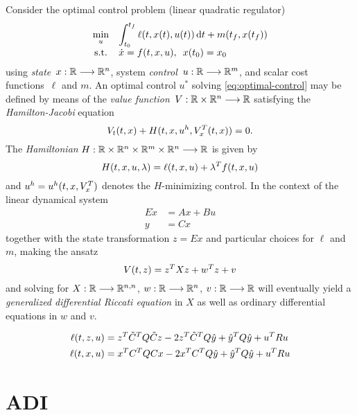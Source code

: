 Consider the optimal control problem
(linear quadratic regulator)
\begin{equation}
  \everymath{\displaystyle}
  \begin{array}{cl}
    \min_u & \int_{t_0}^{t_f} \ell(t, x(t), u(t)) \dt + m(t_f, x(t_f)) \\
    \text{s.t.} & \dot{x} = f(t,x,u), \enspace x(t_0) = x_0
  \end{array}
  \label{eq:optimal-control}
\end{equation}
using \emph{state}~$x:\mathbb{R}\longrightarrow\mathbb{R}^n$, system \emph{control}~$u:\mathbb{R}\longrightarrow\mathbb{R}^m$,
and scalar cost functions~$\ell$ and $m$.
An optimal control $u^*$ solving \eqref{eq:optimal-control} may be defined by means of the
\emph{value function}~$V:\mathbb{R}\times\mathbb{R}^n\longrightarrow\mathbb{R}$ satisfying the \emph{Hamilton-Jacobi} equation
\begin{equation}
  V_t(t,x) + H(t,x,u^h,V_x^T(t,x)) = 0.
  \label{eq:hamilton-jacobi}
\end{equation}
The \emph{Hamiltonian} $H:\mathbb{R}\times\mathbb{R}^n\times\mathbb{R}^m\times\mathbb{R}^n\longrightarrow\mathbb{R}$ is given by
\begin{equation}
  H(t,x,u,\lambda) = \ell(t,x,u) + \lambda^T f(t,x,u)
\end{equation}
and $u^h = u^h(t,x,V_x^T)$ denotes the $H$-minimizing control.
In the context of the linear dynamical system
\begin{equation}
  \begin{aligned}
    E\dot{x} &= Ax + Bu \\
    y &= Cx
  \end{aligned}
\end{equation}
together with the state transformation $z=Ex$ and particular choices for $\ell$ and $m$,
making the ansatz
\begin{equation}
  V(t,z) = z^T Xz + w^T z + v
\end{equation}
and solving for $X:\mathbb{R}\longrightarrow\mathbb{R}^{n,n}$, $w:\mathbb{R}\longrightarrow\mathbb{R}^n$, $v:\mathbb{R}\longrightarrow\mathbb{R}$ will eventually
yield a \emph{generalized differential Riccati equation} in $X$ as well as
ordinary differential equations in $w$ and $v$.
\cite{Locatelli2011}

\begin{align}
  \ell(t, z, u) &= z^T \tilde C^T Q \tilde C z - 2z^T \tilde C^T Q \hat y + \hat y^T Q \hat y + u^T R u \\
  \ell(t, x, u) &= x^T C^T Q C x - 2x^T C^T Q \hat y + \hat y^T Q \hat y + u^T R u
\end{align}
\cite[(3.12)]{Lang2017}

\section{ADI}

